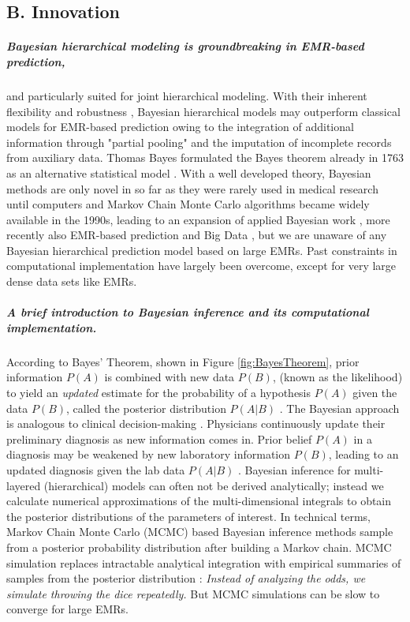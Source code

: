 \documentclass[11pt,notitlepage]{article}
\begin{document}
\subsection*{B. Innovation}

\subparagraph*{Bayesian hierarchical modeling is groundbreaking in EMR-based prediction,} and particularly suited for joint hierarchical modeling. With their inherent flexibility and robustness \cite{Carlin_1349763,Sutton_2012}, Bayesian hierarchical models may outperform classical models for EMR-based prediction owing to the integration of additional information through "partial pooling" \cite{Gelman_red_2009} and the imputation of incomplete records from auxiliary data. Thomas Bayes formulated the Bayes theorem already in 1763 as an alternative statistical model \cite{Thomas_Bayes}. With a well developed theory, Bayesian methods are only novel in so far as they were rarely used in medical research until computers and Markov Chain Monte Carlo algorithms became widely available in the 1990s, leading to an expansion of applied Bayesian work \cite{Ashby_16947924,Spiegelhalter_11134920}, more recently also EMR-based prediction \cite{Himes_19261943,Ryynaenen_23496851,Wu_20473190} and Big Data \cite{Yoo_24987556}, but we are unaware of any Bayesian hierarchical prediction model based on large EMRs. Past constraints in computational implementation have largely been overcome, except for very large dense data sets like EMRs. 

\subparagraph*{A brief introduction to Bayesian inference and its computational implementation.} According to Bayes' Theorem, shown in Figure \ref{fig:BayesTheorem}, prior information $P(A)$ is combined with new data $P(B)$, (known as the likelihood) to yield an \textit{updated} estimate for the probability of a hypothesis $P(A)$ given the data $P(B)$, called the posterior distribution $P(A|B)$ \cite{Kruschke_Book_2014}. The Bayesian approach is analogous to clinical decision-making \cite{Spiegelhalter_11134920}. Physicians continuously update their preliminary diagnosis as new information comes in. Prior belief $P(A)$ in a diagnosis may be weakened by new laboratory information $P(B)$, leading to an updated diagnosis given the lab data $P(A|B)$ \cite{Kruschke_22774788}. Bayesian inference for multi-layered (hierarchical) models can often not be derived analytically; instead we calculate numerical approximations of the multi-dimensional integrals to obtain the posterior distributions of the parameters of interest. In technical terms, Markov Chain Monte Carlo (MCMC) based Bayesian inference methods sample from a posterior probability distribution after building a Markov chain. MCMC simulation replaces intractable analytical integration with empirical summaries of samples from the posterior distribution \cite{Abrams_9483729}: \textit{Instead of analyzing the odds, we simulate throwing the dice repeatedly.} But MCMC simulations can be slow to converge for large EMRs.
\end{document}
